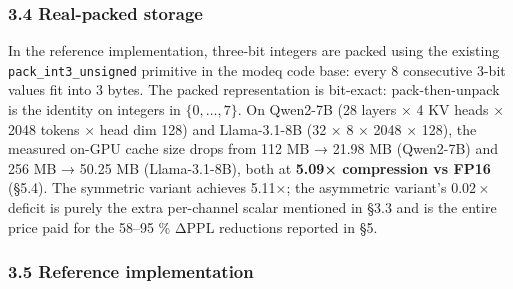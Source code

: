 \subsubsection{3.4 Real-packed storage}\label{real-packed-storage}

In the reference implementation, three-bit integers are packed using the
existing \texttt{pack\_int3\_unsigned} primitive in the modeq code base:
every 8 consecutive 3-bit values fit into 3 bytes. The packed
representation is bit-exact: pack-then-unpack is the identity on
integers in \(\{0, \dots, 7\}\). On Qwen2-7B (28 layers × 4 KV heads ×
2048 tokens × head dim 128) and Llama-3.1-8B (32 × 8 × 2048 × 128), the
measured on-GPU cache size drops from 112 MB → 21.98 MB (Qwen2-7B) and
256 MB → 50.25 MB (Llama-3.1-8B), both at \textbf{5.09× compression vs
FP16} (§5.4). The symmetric variant achieves 5.11×; the asymmetric
variant's \(0.02\times\) deficit is purely the extra per-channel scalar
mentioned in §3.3 and is the entire price paid for the 58--95 \% ΔPPL
reductions reported in §5.

\subsubsection{3.5 Reference
implementation}\label{reference-implementation}

